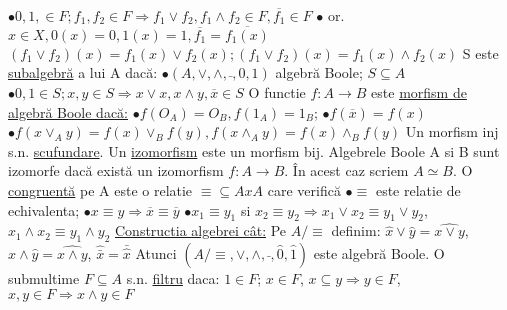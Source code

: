 \documentclass[8pt,twocolumn]{extarticle}
\begin{document}
	$\bullet 0, 1, \in F; f_{1}, f_{2} \in F \Rightarrow f_{1} \vee f_{2}, f_{1} \wedge f_{2} \in F, \overline{f_{1}} \in F$ \newline
	$\bullet$ or. $x \in X, 0(x) = 0, 1(x) = 1, \overline{f_{1}} = \overline{f_{1}(x)}$ \newline
	$(f_{1} \vee f_{2})(x) = f_{1}(x) \vee f_{2}(x); (f_{1} \vee f_{2})(x) = f_{1}(x) \wedge f_{2}(x)$ \newline
	S este \underline{subalgebră} a lui A dacă: \newline
	$\bullet (A, \vee, \wedge, \bar{ }, 0, 1)$ algebră Boole; $S \subseteq A$ \newline
	$\bullet 0, 1 \in S; x, y \in S \Rightarrow x \vee x, x \wedge y, \overline{x} \in S$ \newline
	O functie $f: A \rightarrow B$ este \underline{morfism de algebră Boole dacă:}
	$\bullet f(O_{A}) = O_{B}, f(1_{A}) = 1_{B}$; $\bullet f(\overline{x}) = f(x)$ \newline
	$\bullet f(x \vee _{A} y) = f(x) \vee _{B} f(y), f(x \wedge _{A} y) = f(x) \wedge _{B} f(y)$ \newline
	Un morfism inj s.n. \underline{scufundare}. Un \underline{izomorfism} este un morfism bij. \newline
	Algebrele Boole A si B sunt izomorfe dacă există un izomorfism $f: A \rightarrow B$. În acest caz scriem $A \simeq B$. \newline
	O \underline{congruentă} pe A este o relatie $\equiv \subseteq A x A$ care verifică \newline
	$\bullet \equiv$ este relatie de echivalenta; $\bullet x \equiv y \Rightarrow \overline{x} \equiv \overline{y}$ \newline
	$\bullet x_{1} \equiv y_{1}$ si $x_{2} \equiv y_{2} \Rightarrow x_{1} \vee x_{2} \equiv y_{1} \vee y_{2}$, $x_{1} \wedge x_{2} \equiv y_{1} \wedge y_{2}$ \newline
	\noindent \underline{Constructia algebrei cât:} \newline
	Pe $A/\equiv$ definim: $\hat{x} \vee \hat{y} = \widehat{x \vee y}$, $\hat{x} \wedge \hat{y} = \widehat{x \wedge y}$, $\hat{\bar{x}} = \bar{\hat{x}}$ \newline
	Atunci $(A/\equiv, \vee, \wedge, \bar{ }, \hat{0}, \hat{1})$ este algebră Boole. \newline
	O submultime $F \subseteq A$ s.n. \underline {filtru} daca: \newline
	$1 \in F$; $x \in F$, $x \subseteq y \Rightarrow y \in F$, $x, y \in F \Rightarrow x \wedge y \in F$ \newline
\end{document}
